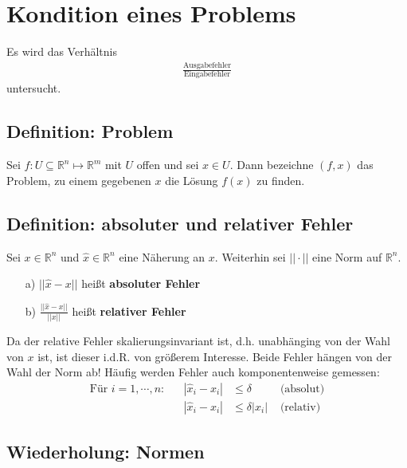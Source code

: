 \documentclass[ngerman,fontsize=11pt, paper=a4, parskip=false, titlepage=false, toc=bib]{scrbook}
\newcommand{\R}{\mathbb{R}}
\begin{document}
\section{Kondition eines Problems} \label{3.2}
Es wird das Verhältnis 
\begin{gather*}
	\frac{\text{Ausgabefehler}}{\text{Eingabefehler}}
\end{gather*}
untersucht.

\subsection{Definition: Problem} \label{3.2.1} 
Sei $f: U \subseteq \R^n \mapsto \R^m$ mit $U$ offen und sei $x\in U$. Dann bezeichne $(f, x)$ das Problem, zu einem gegebenen $x$ die Lösung $f(x)$ zu finden.

\subsection{Definition: absoluter und relativer Fehler} \label{3.2.2} 
Sei $x\in\R^n$ und $\widehat{x} \in \R^n$ eine Näherung an $x$. Weiterhin sei $||\cdot||$ eine Norm auf $\R^n$.
\begin{itemize}
	\item[a)] $||\widehat{x} - x||$ heißt \textbf{absoluter Fehler} 
	\item[b)] $\frac{||\widehat{x} - x||}{||x||}$ heißt \textbf{relativer Fehler}
\end{itemize}
Da der relative Fehler skalierungsinvariant ist, d.h. unabhänging von der  Wahl von $x$ ist, ist dieser i.d.R. von größerem Interesse.
Beide Fehler hängen von der Wahl der Norm ab!
Häufig werden Fehler auch komponentenweise gemessen:
\begin{align*}
	\text{Für } i=1,\cdots , n : && |\widehat{x}_i - x_i | & \leq \delta & \text{ (absolut)} \\
											 && |\widehat{x}_i - x_i | &\leq \delta |x_i| & \text{ (relativ)}
\end{align*}

\subsection{Wiederholung: Normen} \label{3.2.3}
\end{document}
